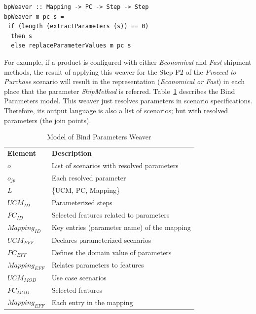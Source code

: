 \documentclass[11pt]{report}
\begin{document}
\begin{lstlisting}[belowskip=10pt,frame=tb,caption={Bind parameter weaver function},label=lst:bind]
bpWeaver :: Mapping -> PC -> Step -> Step
bpWeaver m pc s =
 if (length (extractParameters (s)) == 0)
  then s
  else replaceParameterValues m pc s
\end{lstlisting}

For example, if a product is configured with either \emph{Economical} and 
\emph{Fast} shipment methods, the result of applying this weaver for 
the Step P2 of the \emph{Proceed to Purchase} scenario will result in the 
representation (\emph{Economical or Fast}) in each place that the parameter \emph{ShipMethod} is referred.
Table~\ref{tab:bp-weaver} describes the Bind Parameters model. This weaver just resolves parameters in scenario specifications. Therefore, its output language is also a list of scenarios; but with resolved parameters (the join points). 

\begin{table}[th]
\begin{center}
 \caption{Model of Bind Parameters Weaver} \label{tab:bp-weaver}
\begin{tabular}{p{0.7in}p{2.3in}}
   \hline\noalign{\smallskip}
  {\bf Element} & {\bf Description} \\
   \noalign{\smallskip}
   \hline
   \noalign{\smallskip}
   $o$               & List of scenarios with resolved parameters  \\ 
   $o_{jp}$        & Each resolved parameter \\ 
   $L$               & \{UCM, PC, Mapping\} \\ 
   $UCM_{ID}$ & Parameterized steps \\
   $PC_{ID}$    & Selected features related to parameters \\ 
   $Mapping_{ID}$ & Key entries (parameter name) of the mapping\\
   $UCM_{EFF}$ & Declares parameterized scenarios \\
   $PC_{EFF}$    & Defines the domain value of parameters \\ 
   $Mapping_{EFF}$ & Relates parameters to features \\
   $UCM_{MOD}$ & Use case scenarios \\
   $PC_{MOD}$    & Selected features \\ 
   $Mapping_{EFF}$ & Each entry in the mapping \\
  \hline
  \end{tabular}
\end{center}
\end{table}
\end{document}
